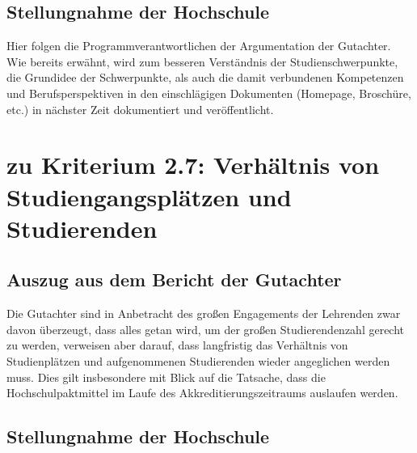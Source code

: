\subsection{Stellungnahme der
Hochschule\label{/mi-2017/selbstbericht/stellungnahme/0000-stellungnahme}}\label{stellungnahme-der-hochschulepathlabelmi-2017selbstberichtstellungnahme0000-stellungnahme-3}

Hier folgen die Programmverantwortlichen der Argumentation der
Gutachter. Wie bereits erwähnt, wird zum besseren Verständnis der
Studienschwerpunkte, die Grundidee der Schwerpunkte, als auch die damit
verbundenen Kompetenzen und Berufsperspektiven in den einschlägigen
Dokumenten (Homepage, Broschüre, etc.) in nächster Zeit dokumentiert und
veröffentlicht.

\section{zu Kriterium 2.7: Verhältnis von Studiengangsplätzen und
Studierenden
\label{/mi-2017/selbstbericht/stellungnahme/0000-stellungnahme}}\label{zu-kriterium-2.7-verhuxe4ltnis-von-studiengangspluxe4tzen-und-studierenden-pathlabelmi-2017selbstberichtstellungnahme0000-stellungnahme}

\subsection{Auszug aus dem Bericht der
Gutachter\label{/mi-2017/selbstbericht/stellungnahme/0000-stellungnahme}}\label{auszug-aus-dem-bericht-der-gutachterpathlabelmi-2017selbstberichtstellungnahme0000-stellungnahme-5}

\begin{siderules}
Die Gutachter sind in Anbetracht des großen Engagements der Lehrenden
zwar davon überzeugt, dass alles getan wird, um der großen
Studierendenzahl gerecht zu werden, verweisen aber darauf, dass
langfristig das Verhältnis von Studienplätzen und aufgenommenen
Studierenden wieder angeglichen werden muss. Dies gilt insbesondere mit
Blick auf die Tatsache, dass die Hochschulpaktmittel im Laufe des
Akkreditierungszeitraums auslaufen werden.
\end{siderules}

\subsection{Stellungnahme der
Hochschule\label{/mi-2017/selbstbericht/stellungnahme/0000-stellungnahme}}\label{stellungnahme-der-hochschulepathlabelmi-2017selbstberichtstellungnahme0000-stellungnahme-4}

